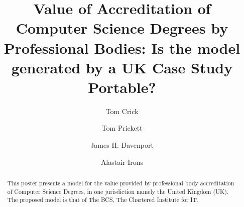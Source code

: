 \documentclass[sigconf]{acmart}
\begin{document}
\fancyhead{}


\title{Value of Accreditation of Computer Science Degrees by Professional Bodies:  Is the model generated by a UK Case Study Portable?}



\author{Tom Crick}

\author{Tom Prickett}

\author{James H. Davenport}


\begin{comment}


\author{Paul Hanna}
\affiliation{%
\institution{Ulster University}
\city{Belfast}
\country{UK}
}
\email{jrp.hanna@ulster.ac.uk}

\end{comment}

\author{Alastair Irons}


%
\renewcommand{\shortauthors}{Trovato and Tobin, et al.}

%
\begin{abstract}
	This poster presents a model for the value provided by professional body accreditation of Computer Science Degrees, in one jurisdiction namely the United Kingdom (UK). The proposed model is that of The BCS, The Chartered Institute for IT. 
\end{abstract}
\end{document}
